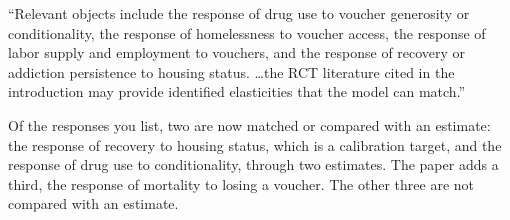 \documentclass[11pt]{article}
\begin{document}
\begin{referee}
``Relevant objects include the response of drug use to voucher generosity or
conditionality, the response of homelessness to voucher access, the response of
labor supply and employment to vouchers, and the response of recovery or addiction
persistence to housing status. \dots the RCT literature cited in the introduction
may provide identified elasticities that the model can match.''
\end{referee}
\begin{response}
Of the responses you list, two are now matched or compared with an estimate: the
response of recovery to housing status, which is a calibration target, and the
response of drug use to conditionality, through two estimates. The paper adds a
third, the response of mortality to losing a voucher. The other three are not
compared with an estimate.


\end{response}
\end{document}
